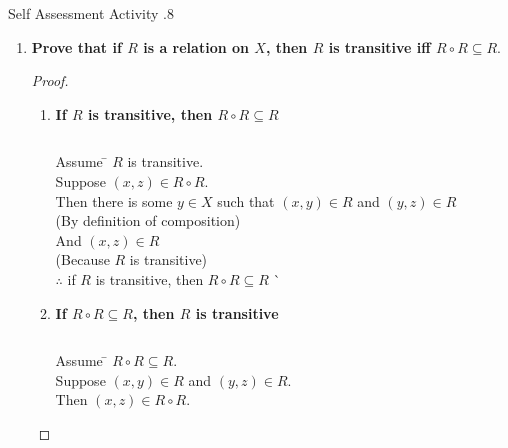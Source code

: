 \documentclass[../notes.tex]{subfiles}
\begin{document}
\begin{exercise}{Self Assessment Activity \thechapter.8}
\begin{enumerate}
\begin{enumerate}[label=(\alph*)]
							\end{enumerate}
						\item \textbf{Prove that if $R$ is a relation on $X$, then $R$ is transitive iff $R \circ R \subseteq R$}.
							\begin{proof}
								$ $
								\begin{enumerate}[label=(\roman*)]
									\item \textbf{If $R$ is transitive, then $R \circ R \subseteq R$}
										\begin{subproof}[Subproof]
											$ $
											\begin{tabbing}
												Assume \qquad \= $R$ is transitive.\\
												Suppose \> $(x, z) \in R \circ R$.\\
												Then \> there is some $y \in X$ such that $(x, y) \in R$ and $(y, z) \in R$\\
												\> (By definition of composition)\\
												And \> $(x, z) \in R$\\
												\> (Because $R$ is transitive)\\
												$\therefore$ \> if $R$ is transitive, then $R \circ R \subseteq R$ \` \qedhere
											\end{tabbing}
										\end{subproof}
									\item \textbf{If $R \circ R \subseteq R$, then $R$ is transitive}
										\begin{subproof}[Subproof]
											$ $
											\begin{tabbing}
												Assume \qquad \= $R \circ R \subseteq R$.\\
												Suppose \> $(x, y) \in R$ and $(y, z) \in R$.\\
												Then \> $(x, z) \in R \circ R$.\\

\end{tabbing}
\end{subproof}
\end{enumerate}
\end{proof}
\end{enumerate}
\end{exercise}
\end{document}
